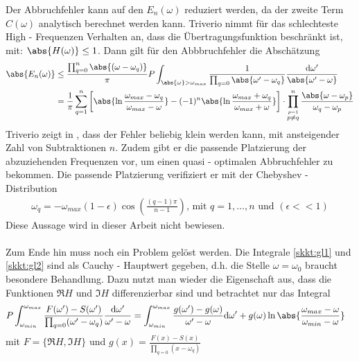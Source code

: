 Der Abbruchfehler kann auf den $E_n(\omega)$ reduziert werden, da der zweite Term $C(\omega)$ analytisch berechnet werden kann. Triverio nimmt für das schlechteste High - Frequenzen Verhalten an, dass die Übertragungsfunktion beschränkt ist, mit: $\abs{H(\omega)} \leq 1$. 
Dann gilt für den Abbbruchfehler die Abschätzung
\begin{align}
	\abs{E_n(\omega)} &\leq \frac{\prod_{q=0}^{n} \abs{(\omega - \omega_q)}}{\pi} P \int_{\abs{\omega} > \omega_{max}} \frac{1}{\prod_{q = 0} \abs{\omega' - \omega_q} } \frac{\mathrm{d\omega'}}{\abs{\omega' -\omega}}\\
	&= \frac{1}{\pi} \sum_{q = 1}^n \left[\abs{\ln{\frac{\omega_{max}-\omega_q}{\omega_{max}-\omega}}} - (-1)^n \abs{\ln{\frac{\omega_{max}+\omega_q}{\omega_{max} + \omega}}} \right] \cdot \prod^{n}_{\stackrel{p=1}{p \neq q}} \frac{\abs{\omega - \omega_p}}{\omega_q - \omega_p}
\end{align}
Triverio zeigt in \cite{Triverio2006a}, dass der Fehler beliebig klein werden kann, mit ansteigender Zahl von Subtraktionen $n$. Zudem gibt er die passende Platzierung der abzuziehenden Frequenzen vor, um einen quasi - optimalen Abbruchfehler zu bekommen. Die passende Platzierung verifiziert er mit der Chebyshev - Distribution
\begin{align}
	\omega_q = -\omega_{max} (1 - \epsilon) \cos\left( \frac{(q-1)\pi}{n-1}\right) \text{, mit } q = 1, \hdots, n \text{ und } (
\epsilon << 1)
\end{align}
Diese Aussage wird in dieser Arbeit nicht bewiesen.\\\\
Zum Ende hin muss noch ein Problem gelöst werden. Die Integrale \ref{skkt:gl1} und \ref{skkt:gl2} sind als Cauchy - Hauptwert gegeben, d.h. die Stelle $\omega = \omega_0$ braucht besondere Behandlung. Dazu nutzt man wieder die Eigenschaft aus, dass die Funktionen $\Re{H}$ und $\Im{H}$ differenzierbar sind und betrachtet nur das Integral 
\begin{align}
	 \label{skkt:int:num} P \int_{\omega_{min}}^{\omega_{max}} \frac{F(\omega') - S(\omega')}{\prod_{q = 0} (\omega' - \omega_q)} \frac{\mathrm{d\omega'}}{\omega' -\omega} &=\int_{\omega_{min}}^{\omega_{max}}  \frac{g(\omega') - g(\omega)}{ \omega' - \omega} \mathrm{d\omega'} + g(\omega) \ln{\abs{\frac{\omega_{max} - \omega}{ \omega_{min} - \omega}}}
\end{align}
mit $F = \{\Re{H}, \Im{H} \}$ und $g(x) = \frac{F(x) - S(x)}{\prod_{q = 0} (x - \omega_q)}$ \\
